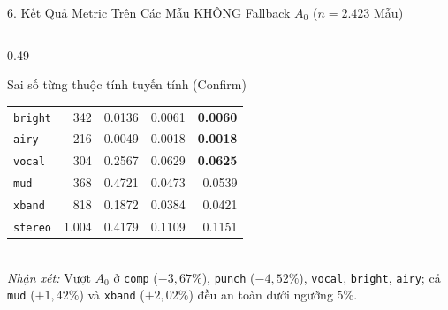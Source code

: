 \documentclass[aspectratio=169,10pt]{beamer}
\begin{document}
\begin{frame}{6. Kết Quả Metric Trên Các Mẫu KHÔNG Fallback $A_0$ ($n = 2.423$ Mẫu)}
\begin{columns}[T]
\begin{column}{0.49\textwidth}
\begin{block}{Sai số từng thuộc tính tuyến tính (Confirm)}
\begin{tabular}{lrrrr}
          \texttt{bright} & 342 & 0.0136 & 0.0061 & \textbf{0.0060} \\
          \texttt{airy} & 216 & 0.0049 & 0.0018 & \textbf{0.0018} \\
          \texttt{vocal} & 304 & 0.2567 & 0.0629 & \textbf{0.0625} \\
          \texttt{mud} & 368 & 0.4721 & 0.0473 & 0.0539 \\
          \texttt{xband} & 818 & 0.1872 & 0.0384 & 0.0421 \\
          \texttt{stereo} & 1.004 & 0.4179 & 0.1109 & 0.1151 \\
          \bottomrule
        \end{tabular}
        \vspace{0.3em}
        \\ \textit{Nhận xét:} Vượt $A_0$ ở \texttt{comp} ($-3{,}67\%$), \texttt{punch} ($-4{,}52\%$), \texttt{vocal}, \texttt{bright}, \texttt{airy}; cả \texttt{mud} ($+1{,}42\%$) và \texttt{xband} ($+2{,}02\%$) đều an toàn dưới ngưỡng $5\%$.
      \end{block}
    \end{column}
  \end{columns}
\end{frame}
\end{document}
